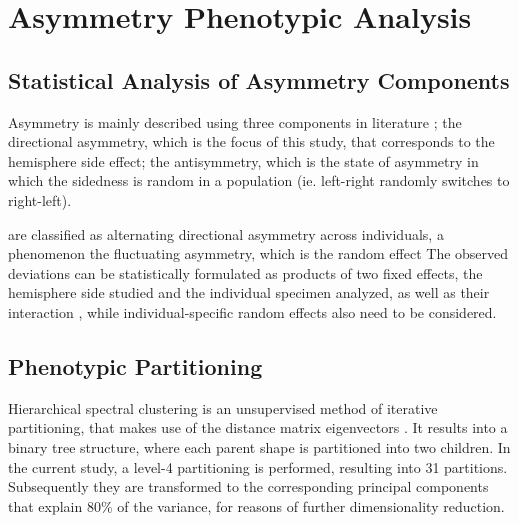 \chapter{Asymmetry Phenotypic Analysis}\label{chap:asymmetry}
\section{Statistical Analysis of Asymmetry Components}
Asymmetry is mainly described using three components in literature \cite{klingenberg2002}\cite{Vingerhoets2021}; the directional asymmetry, which is the focus of this study, that corresponds to the hemisphere side effect; the antisymmetry, which is the state of asymmetry in which the sidedness is random in a population (ie. left-right randomly switches to right-left). 

are classified as alternating directional asymmetry across individuals, a phenomenon 
 the fluctuating asymmetry, which is the random effect
The observed deviations can be statistically formulated as products of two fixed effects, the hemisphere side studied and the individual specimen analyzed, as well as their interaction \cite{klingenberg2002}, while individual-specific random effects also need to be considered.
\section{Phenotypic Partitioning}\label{sec:hsc}
Hierarchical spectral clustering is an unsupervised method of iterative partitioning, that makes use of the distance matrix eigenvectors \cite{Ng2002}. It results into a binary tree structure, where each parent shape is partitioned into two children. In the current study, a level-4 partitioning is performed, resulting into 31 partitions. Subsequently they are transformed to the corresponding principal components that explain 80\% of the variance, for reasons of further dimensionality reduction.